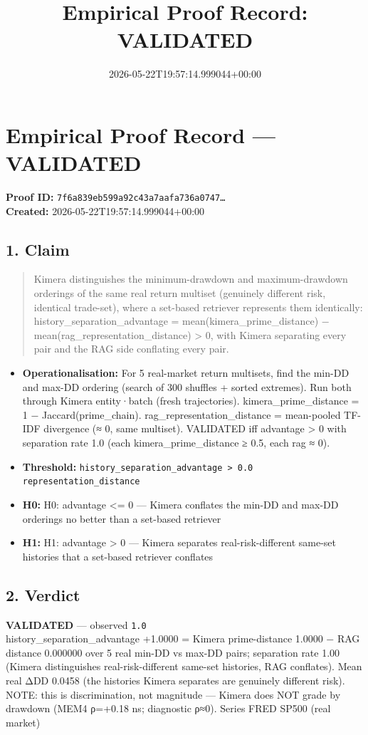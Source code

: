 \documentclass{article}
\title{Empirical Proof Record: VALIDATED}
\date{2026-05-22T19:57:14.999044+00:00}
\begin{document}
\maketitle
\section*{Empirical Proof Record --- \textcolor{validated}{\textbf{VALIDATED}}}
\textbf{Proof ID:} \texttt{7f6a839eb599a92c43a7aafa736a0747\dots}\\
\textbf{Created:} 2026-05-22T19:57:14.999044+00:00
\subsection*{1. Claim}
\begin{quote}Kimera distinguishes the minimum-drawdown and maximum-drawdown orderings of the same real return multiset (genuinely different risk, identical trade-set), where a set-based retriever represents them identically: history\_separation\_advantage = mean(kimera\_prime\_distance) − mean(rag\_representation\_distance) > 0, with Kimera separating every pair and the RAG side conflating every pair.\end{quote}
\begin{itemize}
\item \textbf{Operationalisation:} For 5 real-market return multisets, find the min-DD and max-DD ordering (search of 300 shuffles + sorted extremes). Run both through Kimera entity·batch (fresh trajectories). kimera\_prime\_distance = 1 − Jaccard(prime\_chain). rag\_representation\_distance = mean-pooled TF-IDF divergence (≈ 0, same multiset). VALIDATED iff advantage > 0 with separation rate 1.0 (each kimera\_prime\_distance ≥ 0.5, each rag ≈ 0).
\item \textbf{Threshold:} \texttt{history\_separation\_advantage > 0.0 representation\_distance}
\item \textbf{H0:} H0: advantage <= 0 — Kimera conflates the min-DD and max-DD orderings no better than a set-based retriever
\item \textbf{H1:} H1: advantage > 0 — Kimera separates real-risk-different same-set histories that a set-based retriever conflates
\end{itemize}
\subsection*{2. Verdict}
\textcolor{validated}{\textbf{VALIDATED}} --- observed \texttt{1.0}\\
history\_separation\_advantage +1.0000 = Kimera prime-distance 1.0000 − RAG distance 0.000000 over 5 real min-DD vs max-DD pairs; separation rate 1.00 (Kimera distinguishes real-risk-different same-set histories, RAG conflates). Mean real ΔDD 0.0458 (the histories Kimera separates are genuinely different risk). NOTE: this is discrimination, not magnitude — Kimera does NOT grade by drawdown (MEM4 ρ=+0.18 ns; diagnostic ρ≈0). Series FRED SP500 (real market)
\end{document}
